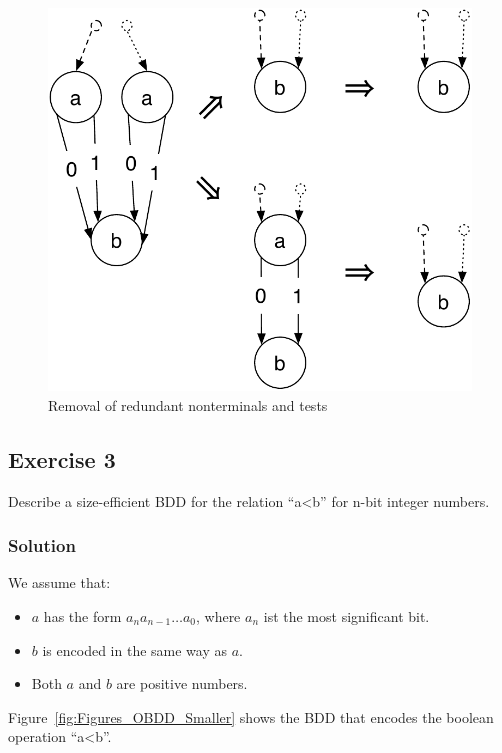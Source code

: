 \documentclass[a4paper, 11pt]{article}
\begin{document}
\begin{figure}[h]
  \centering
    \includegraphics[width=.6\textwidth]{Figures/BDD Removed Nonterminals And Redundant Tests.pdf}
  \caption{Removal of redundant nonterminals and tests}
  \label{fig:Figures_BDD_Removed_Nonterminals_And_Redundant_Tests}
\end{figure}

\newpage
\subsection{Exercise 3}

Describe a size-efficient BDD for the relation “a<b” for n-bit integer numbers.

\subsubsection{Solution}

We assume that:

\begin{itemize}
    \item $a$ has the form $a_na_{n-1}…a_0$, where $a_n$ ist the most significant bit.
    \item $b$ is encoded in the same way as $a$.
    \item Both $a$ and $b$ are positive numbers.
\end{itemize}

Figure~\ref{fig:Figures_OBDD_Smaller} shows the BDD that encodes the boolean operation “a<b”.
\end{document}
